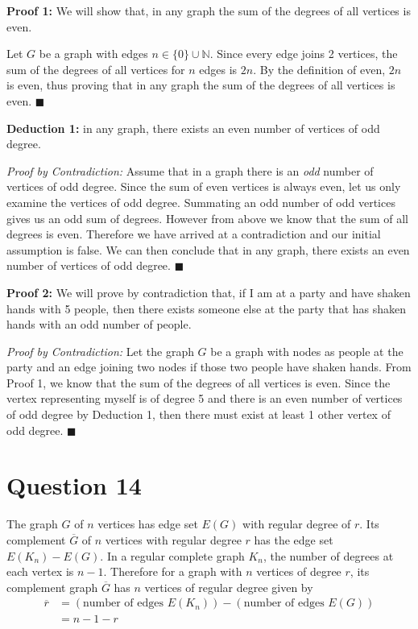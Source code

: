 \documentclass[11pt, oneside]{article}   	%
\newcommand*{\QEDA}{\hfill\ensuremath{\blacksquare}}         %
\begin{document}
{\textbf{Proof 1:} We will show that, in any graph the sum of the degrees of all vertices is even.

Let $G$ be a graph with edges $n \in \{0\} \cup \mathbb{N}$.
Since every edge joins 2 vertices, the sum of the degrees of all vertices for $n$ edges is $2n$. By the definition of even, $2n$ is even, thus proving that in any graph the sum of the degrees of all vertices is even. \QEDA

{\textbf{Deduction 1:} in any graph, there exists an even number of vertices of odd degree.

\textit{Proof by Contradiction:}
 Assume that in a graph there is an \textit{odd} number of vertices of odd degree. Since the sum of even vertices is always even, let us only examine the vertices of odd degree. Summating an odd number of odd vertices gives us an odd sum of degrees. However from above we know that the sum of all degrees is even. Therefore we have arrived at a contradiction and our initial assumption is false. We can then conclude that in any graph, there exists an even number of vertices of odd degree. \QEDA

{\textbf{Proof 2:} We will prove by contradiction that, if I am at a party and have shaken hands with 5 people, then there exists someone else at the party that has shaken hands with an odd number of people.

\textit{Proof by Contradiction:}
Let the graph $G$ be a graph with nodes as people at the party and an edge joining two nodes if those two people have shaken hands. From Proof 1, we know that the sum of the degrees of all vertices is even. Since the vertex representing myself is of degree 5 and there is an even number of vertices of odd degree by Deduction 1, then there must exist at least 1 other vertex of odd degree. \QEDA


\cleardoublepage
\section*{Question 14}

The graph $G$ of $n$ vertices has edge set $E(G)$ with regular degree of $r$. Its complement $\overline{G}$ of $n$ vertices  with regular degree $r$ has the edge set $E(K_n) - E(G)$. In a regular complete graph $K_n$, the number of degrees at each vertex is $n-1$. Therefore for a graph with $n$ vertices of degree $r$, its complement graph $\overline{G}$ has $n$ vertices of regular degree given by
\begin{align*}
\overline{r} & = (\text{number of edges } E(K_n)) - (\text{number of edges } E(G)) \\
& = n-1-r \\
\end{align*}



}}}
\end{document}
